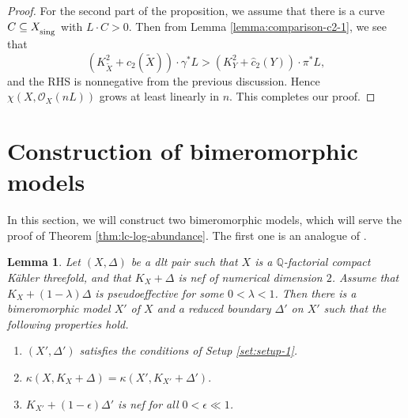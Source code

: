 \documentclass[12pt]{amsart}
\newcommand{\mbQ}{\mathbb{Q}}
\newcommand{\<}{\leq}
\newcommand{\D}{\Delta}
\newtheorem{lemma}[theorem]{Lemma}
\theoremstyle{remark}
\theoremstyle{definition}
\theoremstyle{definition}
\numberwithin{equation}{section}
\theoremstyle{definition}
\theoremstyle{definition}
\def\sing{\operatorname{\textsubscript{\rm sing}}}
\def\red{\operatorname{\textsubscript{\rm red}}}
\begin{document}
\begin{proof}
For the second part of the proposition, we assume that  there is a curve $C\subseteq X_{\sing}$ with $L\cdot C >0$. 
Then from Lemma \ref{lemma:comparison-c2-1}, we see that 
\[(K_{\widetilde{X}}^2+c_2(\widetilde{X}))\cdot \gamma^*L  > (K_{Y}^2+\hat{c}_2(Y)) \cdot \pi^*L,\]
and the RHS is nonnegative from the previous discussion. 
Hence $\chi(X, \mathscr{O}_{{X}}(n L))$ grows at least linearly in $n$. 
This completes our proof.
\end{proof}



\section{Construction of bimeromorphic models}

In this section, we will construct two bimeromorphic models, which will serve the proof of Theorem \ref{thm:lc-log-abundance}. 
The first one is an analogue of \cite[Lemma 14.2]{Kol92}. 


\begin{lemma}
\label{lemma:reduction-2.1}
Let $(X,\Delta)$ be a dlt pair such that $X$ is a $\mathbb{Q}$-factorial compact K\"ahler threefold, and that $K_X+\Delta$ is nef of numerical dimension $2$. 
Assume that  $K_X+(1-\lambda)\Delta$ is pseudoeffective for some $0<\lambda< 1$. 
Then there is a bimeromorphic model $X'$ of $X$ and a reduced boundary $\Delta'$ on $X'$ such that the following properties hold.
\begin{enumerate}
 \item $(X',\D')$  satisfies the conditions of Setup \ref{set:setup-1}. 
\item $\kappa(X, K_X+\Delta) = \kappa(X', K_{X'}+\Delta').$
\item $K_{X'}+(1-\epsilon)\Delta'$ is nef for all $0<\epsilon\ll 1$.
\end{enumerate}
\end{lemma}
\end{document}
